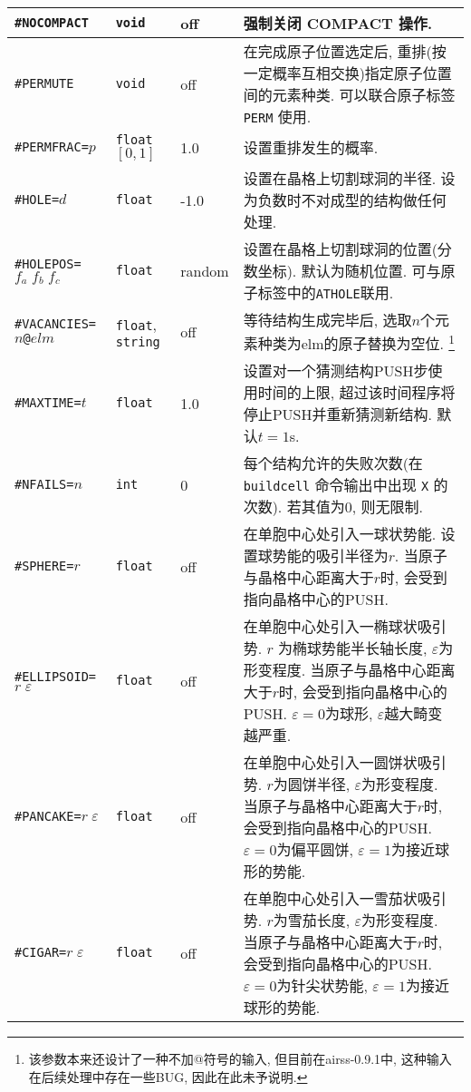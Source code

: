 \documentclass[a4paper, 10pt]{article}
\begin{document}
\begin{center}
\begin{longtable}{m{11em}|m{4em}<{\centering}|m{3em}<{\centering}|m{15em}}
\midrule
\verb|#NOCOMPACT| & \verb|void| & off & 强制关闭 COMPACT 操作.\\
\midrule
\verb|#PERMUTE| & \verb|void| & off & 在完成原子位置选定后, 重排(按一定概率互相交换)指定原子位置间的元素种类. 可以联合原子标签 \verb|PERM| 使用.\\
\midrule
\verb|#PERMFRAC=|\(p\) & \verb|float| \([0,1]\)  & 1.0 & 设置重排发生的概率.\\
\midrule
\verb|#HOLE=|\(d\) & \verb|float| & -1.0 & 设置在晶格上切割球洞的半径. 设为负数时不对成型的结构做任何处理.\\
\midrule
\verb|#HOLEPOS=|\(f_a\;f_b\;f_c\) & \verb|float| & random & 设置在晶格上切割球洞的位置(分数坐标). 默认为随机位置. 可与原子标签中的\verb|ATHOLE|联用.\\
\midrule
\verb|#VACANCIES=|\(n\)\verb|@|\(elm\)& \verb|float|, \verb|string| & off & 等待结构生成完毕后, 选取\(n\)个元素种类为elm的原子替换为空位. \footnote{该参数本来还设计了一种不加@符号的输入, 但目前在airss-0.9.1中, 这种输入在后续处理中存在一些BUG, 因此在此未予说明.}\\
\midrule
\verb|#MAXTIME=|\(t\)& \verb|float| & 1.0 & 设置对一个猜测结构PUSH步使用时间的上限, 超过该时间程序将停止PUSH并重新猜测新结构. 默认\(t=1\)s.\\
\midrule
\verb|#NFAILS=|\(n\)& \verb|int| & 0 & 每个结构允许的失败次数(在 \verb|buildcell| 命令输出中出现 \verb|X| 的次数). 若其值为0, 则无限制.\\
\midrule
\verb|#SPHERE=|\(r\) & \verb|float| & off & 在单胞中心处引入一球状势能. 设置球势能的吸引半径为\(r\). 当原子与晶格中心距离大于\(r\)时, 会受到指向晶格中心的PUSH.\\
\midrule
\verb|#ELLIPSOID=|\(r\;\varepsilon\) & \verb|float|  & off & 在单胞中心处引入一椭球状吸引势. \(r\) 为椭球势能半长轴长度, \(\varepsilon\)为形变程度. 当原子与晶格中心距离大于\(r\)时, 会受到指向晶格中心的PUSH. \(\varepsilon=0\)为球形, \(\varepsilon\)越大畸变越严重. \\
\midrule
\verb|#PANCAKE=|\(r\;\varepsilon\) & \verb|float|  & off & 在单胞中心处引入一圆饼状吸引势. \(r\)为圆饼半径, \(\varepsilon\)为形变程度. 当原子与晶格中心距离大于\(r\)时, 会受到指向晶格中心的PUSH. \(\varepsilon=0\)为偏平圆饼, \(\varepsilon=1\)为接近球形的势能. \\
\midrule
\verb|#CIGAR=|\(r\;\varepsilon\) & \verb|float| & off & 在单胞中心处引入一雪茄状吸引势. \(r\)为雪茄长度, \(\varepsilon\)为形变程度. 当原子与晶格中心距离大于\(r\)时, 会受到指向晶格中心的PUSH. \(\varepsilon=0\)为针尖状势能, \(\varepsilon=1\)为接近球形的势能. \\

\end{longtable}
\end{center}
\end{document}

